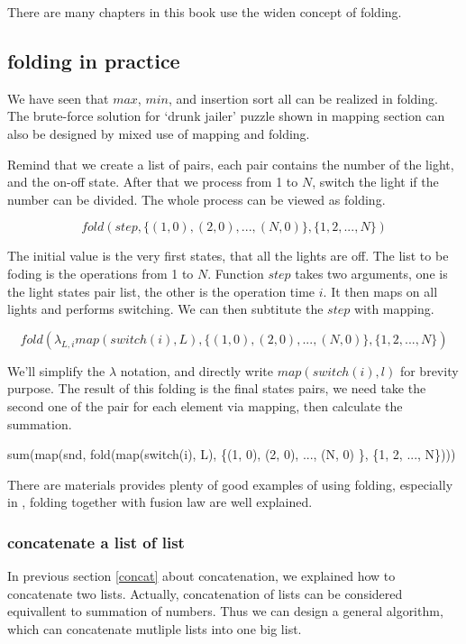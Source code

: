 \documentclass{article}
\begin{document}
There are many chapters in this book use the widen concept of folding.

\subsection{folding in practice}

We have seen that $max$, $min$, and insertion sort all can be realized in folding. The 
brute-force solution for `drunk jailer' puzzle shown in mapping section can also be
designed by mixed use of mapping and folding.

Remind that we create a list of pairs, each pair contains the number of the light, and 
the on-off state. After that we process from 1 to $N$, switch the light if the number
can be divided. The whole process can be viewed as folding.

\[
fold(step, \{(1, 0), (2, 0), ..., (N, 0) \}, \{1, 2, ..., N\})
\]

The initial value is the very first states, that all the lights are off. The list to be
foding is the operations from 1 to $N$. Function $step$ takes two arguments, one is
the light states pair list, the other is the operation time $i$. It then maps
on all lights and performs switching. We can then subtitute the $step$ with mapping.

\[
fold(\lambda_{L, i} map(switch(i), L), \{(1, 0), (2, 0), ..., (N, 0) \}, \{1, 2, ..., N\})
\]

We'll simplify the $\lambda$ notation, and directly write $map(switch(i), l)$ for brevity purpose.
The result of this folding is the final states pairs, we need take the second one of the pair
for each element via mapping, then calculate the summation.

\be
sum(map(snd, fold(map(switch(i), L), \{(1, 0), (2, 0), ..., (N, 0) \}, \{1, 2, ..., N\})))
\ee

There are materials provides plenty of good examples of using folding, especially in \cite{fp-pearls},
folding together with fusion law are well explained.

\subsubsection{concatenate a list of list}

In previous section \ref{concat} about concatenation, we explained how to concatenate two lists.
Actually, concatenation of lists can be considered equivallent to summation of numbers. Thus we
can design a general algorithm, which can concatenate mutliple lists into one big list.
\end{document}
